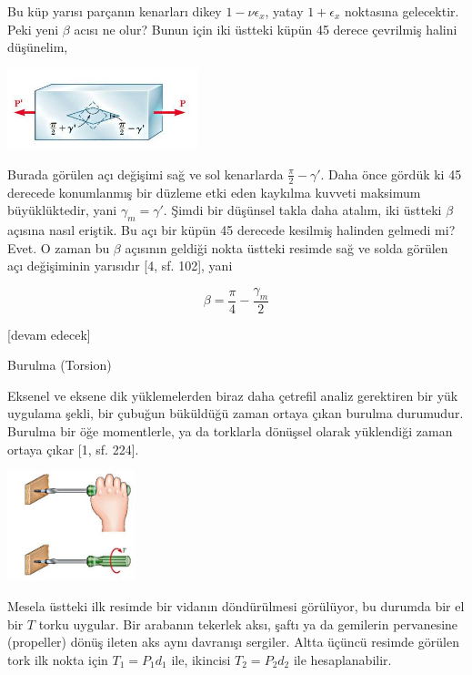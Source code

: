 \documentclass[12pt,fleqn]{article}\usepackage{../../common}
\begin{document}
Bu küp yarısı parçanın kenarları dikey $1-\nu \epsilon_x$, yatay $1 + \epsilon_x$
noktasına gelecektir. Peki yeni $\beta$ acısı ne olur? Bunun için iki
üstteki küpün 45 derece çevrilmiş halini düşünelim,

\includegraphics[width=15em]{phy_020_strs_06_09.jpg}

Burada görülen açı değişimi sağ ve sol kenarlarda $\frac{\pi}{2} - \gamma'$.
Daha önce gördük ki 45 derecede konumlanmış bir düzleme etki eden kaykılma
kuvveti maksimum büyüklüktedir, yani $\gamma_m = \gamma'$. Şimdi bir düşünsel
takla daha atalım, iki üstteki $\beta$ açısına nasıl eriştik. Bu açı bir küpün
45 derecede kesilmiş halinden gelmedi mi? Evet. O zaman bu $\beta$ açısının
geldiği nokta üstteki resimde sağ ve solda görülen açı değişiminin yarısıdır
[4, sf. 102], yani

$$
\beta = \frac{\pi}{4} - \frac{\gamma_m}{2}
$$


[devam edecek]

















Burulma (Torsion)

Eksenel ve eksene dik yüklemelerden biraz daha çetrefil analiz gerektiren bir
yük uygulama şekli, bir çubuğun büküldüğü zaman ortaya çıkan burulma durumudur.
Burulma bir öğe momentlerle, ya da torklarla dönüşsel olarak yüklendiği zaman
ortaya çıkar [1, sf. 224].

\includegraphics[width=10em]{phy_020_strs_06_01.jpg}

Mesela üstteki ilk resimde bir vidanın döndürülmesi görülüyor, bu durumda bir el
bir $T$ torku uygular. Bir arabanın tekerlek aksı, şaftı ya da gemilerin
pervanesine (propeller) dönüş ileten aks aynı davranışı sergiler.  Altta üçüncü
resimde görülen tork ilk nokta için $T_1 = P_1 d_1$ ile, ikincisi $T_2 = P_2
d_2$ ile hesaplanabilir.
\end{document}
